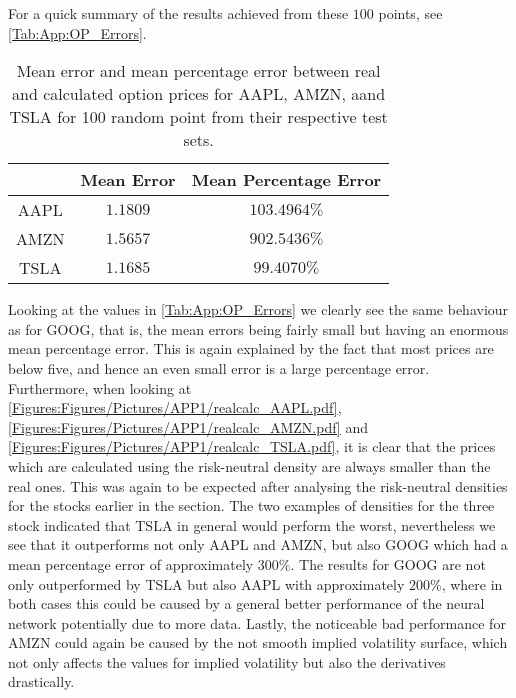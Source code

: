 \vspace{-1.5em}\vspace{-3em}
\vspace{-3em}
\vspace{-0.5em}

For a quick summary of the results achieved from these $100$ points, see \autoref{Tab:App:OP_Errors}.

\begin{table}[H]
     \centering
     \begin{tabular}{c|cc}
               & Mean Error & Mean Percentage Error \\ \hline
          AAPL & $1.1809$ & $103.4964\%$ \\
          AMZN & $1.5657$ & $902.5436\%$ \\
          TSLA & $1.1685$ & $99.4070\%$
     \end{tabular}
     \caption{Mean error and mean percentage error between real and calculated option prices for AAPL, AMZN, aand TSLA for 100 random point from their respective test sets.}
     \label{Tab:App:OP_Errors}
 \end{table}

Looking at the values in \autoref{Tab:App:OP_Errors} we clearly see the same behaviour as for GOOG, that is, the mean errors being fairly small but having an enormous mean percentage error. This is again explained by the fact that most prices are below five, and hence an even small error is a large percentage error. Furthermore, when looking at \autoref{Figures:Figures/Pictures/APP1/realcalc_AAPL.pdf}, \autoref{Figures:Figures/Pictures/APP1/realcalc_AMZN.pdf} and \autoref{Figures:Figures/Pictures/APP1/realcalc_TSLA.pdf}, it is clear that the prices which are calculated using the risk-neutral density are always smaller than the real ones. This was again to be expected after analysing the risk-neutral densities for the stocks earlier in the section. The two examples of densities for the three stock indicated that TSLA in general would perform the worst, nevertheless we see that it outperforms not only AAPL and AMZN, but also GOOG which had a mean percentage error of approximately $300\%$. The results for GOOG are not only outperformed by TSLA but also AAPL with approximately $200\%$, where in both cases this could be caused by a general better performance of the neural network potentially due to more data. Lastly, the noticeable bad performance for AMZN could again be caused by the not smooth implied volatility surface, which not only affects the values for implied volatility but also the derivatives drastically. 

